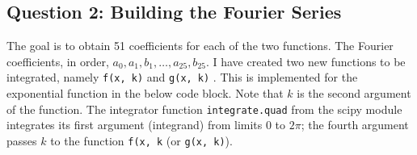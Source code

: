 \documentclass[11pt, a4paper]{article}
\begin{document}
  \subsection{Question 2: Building the Fourier Series}
  The goal is to obtain 51 coefficients for each of the two functions. The Fourier coefficients, in order, $a_{0}, a_{1}, b_{1}, \ldots{},a_{25}, b_{25}$. I have created two new functions to be integrated, namely \texttt{f(x, k)} and \texttt{g(x, k)} . This is implemented for the exponential function in the below code block. Note that $k$ is the second argument of the function. The integrator function \texttt{integrate.quad} from the scipy module integrates its first argument (integrand) from limits $0$ to $2\pi$; the fourth argument passes $k$ to the function \texttt{f(x, k} (or \texttt{g(x, k)}).
     
\end{document}
